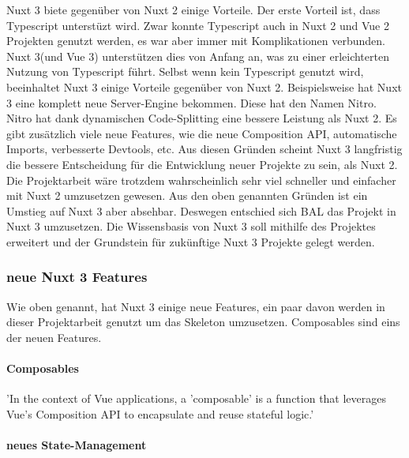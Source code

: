 Nuxt 3 biete gegenüber von Nuxt 2 einige Vorteile. Der erste Vorteil ist, dass Typescript unterstüzt wird. Zwar konnte Typescript auch in Nuxt 2 und Vue 2 Projekten genutzt werden, es war aber immer mit Komplikationen verbunden. Nuxt 3(und Vue 3) unterstützen dies von Anfang an, was zu einer erleichterten Nutzung von Typescript führt. Selbst wenn kein Typescript genutzt wird, beeinhaltet Nuxt 3 einige Vorteile gegenüber von Nuxt 2. Beispielsweise hat Nuxt 3 eine komplett neue Server-Engine bekommen. Diese hat den Namen Nitro. Nitro hat dank dynamischen Code-Splitting eine bessere Leistung als Nuxt 2. Es gibt zusätzlich viele neue Features, wie die neue Composition API, automatische Imports, verbesserte Devtools, etc. Aus diesen Gründen scheint Nuxt 3 langfristig die bessere Entscheidung für die Entwicklung neuer Projekte zu sein, als Nuxt 2. Die Projektarbeit wäre trotzdem wahrscheinlich sehr viel schneller und einfacher mit Nuxt 2 umzusetzen gewesen. Aus den oben genannten Gründen ist ein Umstieg auf Nuxt 3 aber absehbar. Deswegen entschied sich \acs{BAL} das Projekt in Nuxt 3 umzusetzen. Die Wissensbasis von Nuxt 3 soll mithilfe des Projektes erweitert und der Grundstein für zukünftige Nuxt 3 Projekte gelegt werden.

\subsubsection{neue Nuxt 3 Features}
\label{sec:neue Nuxt 3 Features}

Wie oben genannt, hat Nuxt 3 einige neue Features, ein paar davon werden in dieser Projektarbeit genutzt um das Skeleton umzusetzen. Composables sind eins der neuen Features.

\paragraph{Composables}

'In the context of Vue applications, a 'composable' is a function that leverages Vue's Composition API to encapsulate and reuse stateful logic.'

\paragraph{neues State-Management}

